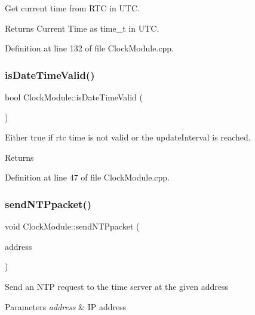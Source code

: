Get current time from R\+TC in U\+TC. \begin{DoxyReturn}{Returns}
Current Time as time\+\_\+t in U\+TC. 
\end{DoxyReturn}


Definition at line 132 of file Clock\+Module.\+cpp.

\mbox{\label{class_clock_module_a05053d7409ef43d1729113a7912fa866}} 
\subsubsection{\texorpdfstring{isDateTimeValid()}{isDateTimeValid()}}
{\footnotesize\ttfamily bool Clock\+Module\+::is\+Date\+Time\+Valid (\begin{DoxyParamCaption}{ }\end{DoxyParamCaption})}

Either true if rtc time is not valid or the update\+Interval is reached. \begin{DoxyReturn}{Returns}

\end{DoxyReturn}


Definition at line 47 of file Clock\+Module.\+cpp.

\mbox{\label{class_clock_module_a266855ecf4aa1f466d1a3556caff008c}} 
\subsubsection{\texorpdfstring{sendNTPpacket()}{sendNTPpacket()}}
{\footnotesize\ttfamily void Clock\+Module\+::send\+N\+T\+Ppacket (\begin{DoxyParamCaption}\item[{I\+P\+Address \&}]{address }\end{DoxyParamCaption})\hspace{0.3cm}{\ttfamily [private]}}

Send an N\+TP request to the time server at the given address 
\begin{DoxyParams}{Parameters}
{\em address} & IP address \\
\hline
\end{DoxyParams}


